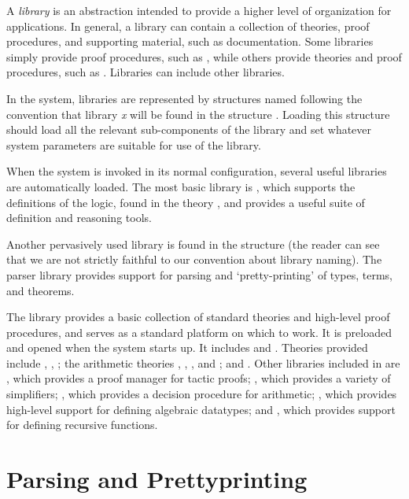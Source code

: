 {
 \newcommand{\term}      {\mbox{\it term}}
 \newcommand{\vstr}      {\mbox{\it vstr}}

A \emph{library} is an abstraction intended to provide a higher level
of organization for \HOL{} applications. In general, a library can
contain a collection of theories, proof procedures, and supporting
material, such as documentation. Some libraries simply provide proof
procedures, such as , while others provide theories and
proof procedures, such as . Libraries can include other
libraries.

In the \HOL{} system, libraries are represented by \ML{} structures
named following the convention that library \emph{x} will be found in
the \ML{} structure . Loading this structure should load all
the relevant sub-components of the library and set whatever system
parameters are suitable for use of the library.

When the \HOL{} system is invoked in its normal configuration, several
useful libraries are automatically loaded. The most basic \HOL{}
library is , which supports the definitions of
the \HOL{} logic, found in the theory , and provides a
useful suite of definition and reasoning tools.

Another pervasively used library is found in the structure 
(the reader can see that we are not strictly faithful to our
convention about library naming). The parser library provides support
for parsing and `pretty-printing' of \HOL{} types, terms, and
theorems.

The  library provides a basic collection of standard
theories and high-level proof procedures, and serves as a standard
platform on which to work. It is preloaded and opened when the \HOL{}
system starts up. It includes  and
. Theories provided include ,
, ; the arithmetic theories
, , ,
and ; and . Other libraries
included in  are , which provides
a proof manager for tactic proofs; , which provides
a variety of simplifiers; , which provides a decision
procedure for arithmetic; , which provides
high-level support for defining algebraic datatypes; and ,
which provides support for defining recursive functions.


\section{Parsing and Prettyprinting}

}
